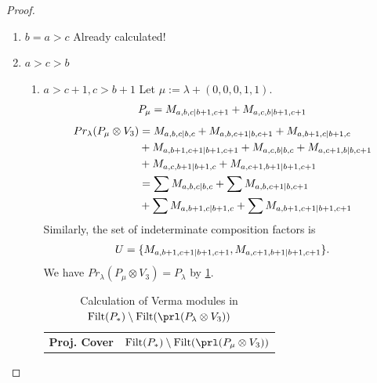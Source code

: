 \begin{proof}
\begin{enumerate}
\begin{enumerate}
    \end{enumerate}

  \item $b=a>c$   Already calculated!

  \item $a>c>b$
    \begin{enumerate}
      \item $a>c+1, c>b+1$
        Let $\mu:=\lambda + (0,0,0,1,1) $.
        \begin{equation}\notag
          \begin{aligned}
            P_\mu = M_{a,b,c|b+1,c+1}
+ M_{a,c,b|b+1,c+1}
          \end{aligned}
        \end{equation}
        \begin{equation}\notag
          \begin{aligned}
            Pr_{\lambda}(P_\mu \otimes V_{3}) &=
M_{a,b,c|b,c}
+ M_{a,b,c+1|b,c+1}
+ M_{a,b+1,c|b+1,c}\\
                                            &
+ M_{a,b+1,c+1|b+1,c+1}
+ M_{a,c,b|b,c}
+ M_{a,c+1,b|b,c+1}\\
                                            &
+ M_{a,c,b+1|b+1,c}
+ M_{a,c+1,b+1|b+1,c+1} \\
                                               &=
\sum M_{a,b,c|b,c}
 +\sum M_{a,b,c+1|b,c+1}\\
                                            &
 +\sum M_{a,b+1,c|b+1,c}
 +\sum M_{a,b+1,c+1|b+1,c+1}
          \end{aligned}
        \end{equation}
      Similarly, the set of indeterminate composition factors is 
\begin{equation}\notag
  \begin{aligned}
    U = \{
M_{a,b+1,c+1|b+1,c+1},
M_{a,c+1,b+1|b+1,c+1}
\}.
  \end{aligned}
\end{equation}
       We have $Pr_{\lambda}(P_\mu \otimes V_{3}) = P_\lambda  $ by \cref{tab:verma-analysis_12}.
\begin{table}[htbp]
\centering
\caption{Calculation of Verma modules in $\operatorname{Filt}(P_*) \setminus \operatorname{Filt}(\prl(P_\lambda \otimes V_{3})) $ } \label{tab:verma-analysis_12}
\begin{tabular}{cc}
\toprule
\textbf{Proj. Cover} & \textbf{$\operatorname{Filt}(P_*) \setminus \operatorname{Filt}(\prl(P_\mu \otimes V_{3})) $}  \\

\end{tabular}
\end{table}
\end{enumerate}
\end{enumerate}
\end{proof}
